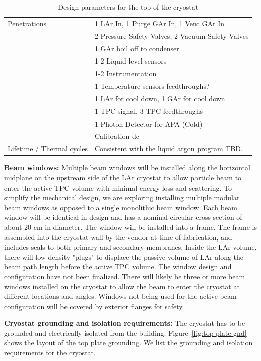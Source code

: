 \begin{table}[htpb]
\begin{tabular}{|p{}|p{}|}
Penetrations  &  1 LAr In, 1 Purge GAr In, 1 Vent GAr In \\ 
& 2 Pressure Safety Valves, 2 Vacuum Safety Valves \\ 
& 1 GAr boil off to condenser \\ 
& 1-2 Liquid level sensors \\ 
& 1-2 Instrumentation \\ 
& 1 Temperature sensors feedthroughs? \\ 
& 1 LAr for cool down, 1 GAr for cool down \\ 
& 1 TPC signal, 3 TPC feedthroughs \\
& 1 Photon Detector for APA (Cold) \\
& Calibration dc\\ \hline
Lifetime / Thermal cycles  & Consistent with the liquid argon program TBD. \\ \hline
\end{tabular}
\caption{Design parameters for the top of the cryostat}
\label{tbl:cryostat-top-parameters}
\end{table}

\textbf{Beam windows:}
Multiple beam windows will be installed along the horizontal midplane
on the upstream side of the LAr cryostat to allow particle beam to
enter the active TPC volume with minimal energy loss and scattering.
To simplify the mechanical design, we are exploring installing
multiple modular beam windows as opposed to a single monolithic beam
window. Each beam window will be identical in design and has a nominal
circular cross section of about 20 cm in diameter. The window will be
installed into a frame. The frame is assembled into the cryostat wall
by the vendor at time of fabrication, and includes seals to both
primary and secondary membranes. Inside the LAr volume, there will low
density "plugs" to displace the passive volume of LAr along the beam
path length before the active TPC volume. The window design and
configuration have not been finalized. There will likely be three or
more beam windows installed on the cryostat to allow the beam to enter
the cryostat at different locations and angles. Windows not being used
for the active beam configuration will be covered by exterior flanges
for safety.

\textbf{Cryostat grounding and isolation requirements:}
%
The cryostat has to be grounded and electrically isolated from the building. 
Figure~\ref{fig:top-plate-gnd} shows the layout of the top plate grounding.
We list the grounding and isolation requirements for the cryostat. 

